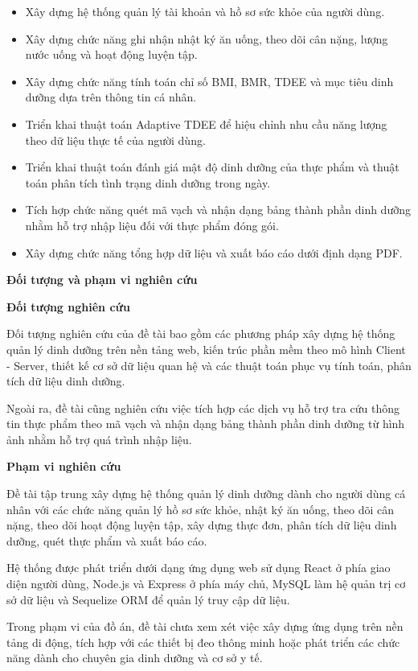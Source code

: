 \documentclass[12pt, a4paper]{report}
\begin{document}
\begin{itemize}
\item Xây dựng hệ thống quản lý tài khoản và hồ sơ sức khỏe của người dùng.
\item Xây dựng chức năng ghi nhận nhật ký ăn uống, theo dõi cân nặng, lượng nước uống và hoạt động luyện tập.
\item Xây dựng chức năng tính toán chỉ số BMI, BMR, TDEE và mục tiêu dinh dưỡng dựa trên thông tin cá nhân.
\item Triển khai thuật toán Adaptive TDEE để hiệu chỉnh nhu cầu năng lượng theo dữ liệu thực tế của người dùng.
\item Triển khai thuật toán đánh giá mật độ dinh dưỡng của thực phẩm và thuật toán phân tích tình trạng dinh dưỡng trong ngày.
\item Tích hợp chức năng quét mã vạch và nhận dạng bảng thành phần dinh dưỡng nhằm hỗ trợ nhập liệu đối với thực phẩm đóng gói.
\item Xây dựng chức năng tổng hợp dữ liệu và xuất báo cáo dưới định dạng PDF.
\end{itemize}
\textbf{Đối tượng và phạm vi nghiên cứu}

\textbf{Đối tượng nghiên cứu}

Đối tượng nghiên cứu của đề tài bao gồm các phương pháp xây dựng hệ thống quản lý dinh dưỡng trên nền tảng web, kiến trúc phần mềm theo mô hình Client - Server, thiết kế cơ sở dữ liệu quan hệ và các thuật toán phục vụ tính toán, phân tích dữ liệu dinh dưỡng.

Ngoài ra, đề tài cũng nghiên cứu việc tích hợp các dịch vụ hỗ trợ tra cứu thông tin thực phẩm theo mã vạch và nhận dạng bảng thành phần dinh dưỡng từ hình ảnh nhằm hỗ trợ quá trình nhập liệu.

\textbf{Phạm vi nghiên cứu}

Đề tài tập trung xây dựng hệ thống quản lý dinh dưỡng dành cho người dùng cá nhân với các chức năng quản lý hồ sơ sức khỏe, nhật ký ăn uống, theo dõi cân nặng, theo dõi hoạt động luyện tập, xây dựng thực đơn, phân tích dữ liệu dinh dưỡng, quét thực phẩm và xuất báo cáo.

Hệ thống được phát triển dưới dạng ứng dụng web sử dụng React ở phía giao diện người dùng, Node.js và Express ở phía máy chủ, MySQL làm hệ quản trị cơ sở dữ liệu và Sequelize ORM để quản lý truy cập dữ liệu.

Trong phạm vi của đồ án, đề tài chưa xem xét việc xây dựng ứng dụng trên nền tảng di động, tích hợp với các thiết bị đeo thông minh hoặc phát triển các chức năng dành cho chuyên gia dinh dưỡng và cơ sở y tế.
\end{document}

